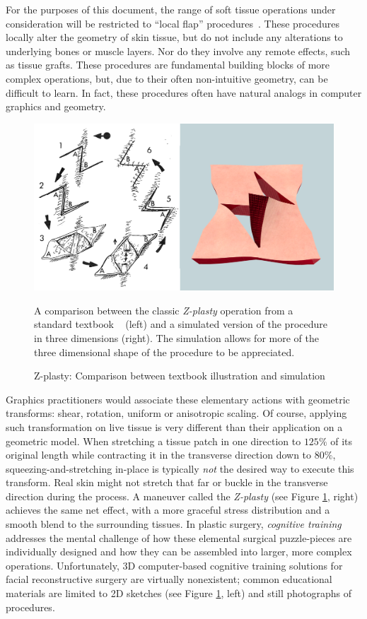 For the purposes of this document, the range of soft tissue
operations under consideration will be restricted to ``local flap''
procedures~\citep{Baker:2014}. These procedures locally alter the
geometry of skin tissue, but do not include any alterations to
underlying bones or muscle layers. Nor do they involve any remote
effects, such as tissue grafts. These procedures are fundamental
building blocks of more complex operations, but, due to their often
non-intuitive geometry, can be difficult to learn. In fact, these
procedures often have natural analogs in computer graphics and
geometry.

\begin{figure}
  \includegraphics[width=\textwidth]{chapter_gridiron/images/zPlastyComparison.png}
  \caption{Z-plasty: Comparison between textbook illustration and simulation}{A
    comparison between the classic \textit{Z-plasty} operation from a standard
    textbook ~\citep{McCarthy1990} (left) and a simulated version of the procedure
    in three dimensions (right). The simulation allows for
    more of the three dimensional shape of the procedure to be
    appreciated.}
  \label{fig:ZPlastyComparison}
\end{figure}

Graphics practitioners would associate these elementary actions with
geometric transforms: shear, rotation, uniform or anisotropic
scaling. Of course, applying such transformation on live tissue is
very different than their application on a geometric model. When
stretching a tissue patch in one direction to $125\%$ of its original
length while contracting it in the transverse direction down to
$80\%$, squeezing-and-stretching in-place is typically \emph{not} the
desired way to execute this transform. Real skin might not stretch
that far or buckle in the transverse direction during the process. A
maneuver called the \emph{Z-plasty} (see Figure
\ref{fig:ZPlastyComparison}, right) achieves the same net effect, with
a more graceful stress distribution and a smooth blend to the
surrounding tissues. In plastic surgery, \textit{cognitive training}
addresses the mental challenge of how these elemental surgical
puzzle-pieces are individually designed and how they can be assembled
into larger, more complex operations. Unfortunately, 3D computer-based
cognitive training solutions for facial reconstructive surgery are
virtually nonexistent; common educational materials are limited to 2D
sketches (see Figure \ref{fig:ZPlastyComparison}, left) and still
photographs of procedures.

